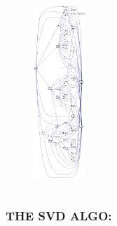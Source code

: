 \documentclass[a4paper,8pt]{beamer} %
\begin{document}
\begin{frame}
\begin{columns}[l]
%
\column{2.8cm}
%
\begin{figure}%
\begin{center}
\includegraphics[height=6.5cm]{callg_dsyev.png} 
\end{center}
\end{figure}
%
\end{columns}
\end{frame}%

\begin{frame} \frametitle{THE SVD ALGO:}
\end{frame}



\end{document}
